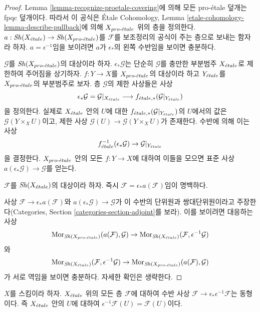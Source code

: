 \begin{proof}
Lemma \ref{lemma-recognize-proetale-covering}에 의해 모든 pro-\'etale
덮개는 fpqc 덮개이다. 따라서 이 공식은 \'Etale Cohomology, Lemma
\ref{etale-cohomology-lemma-describe-pullback}에 의해 $X_{pro\text{-}\acute{e}tale}$ 위의
층을 정의한다. $a : \mathop{\mathit{Sh}}\nolimits(X_{\acute{e}tale}) \to \mathop{\mathit{Sh}}\nolimits(X_{pro\text{-}\acute{e}tale})$를
$\mathcal{F}$를 보조정리의 공식이 주는 층으로 보내는 함자라 하자.
$a = \epsilon^{-1}$임을 보이려면 $a$가 $\epsilon_*$의 왼쪽
수반임을 보이면 충분하다.

\medskip\noindent
$\mathcal{G}$를 $\mathop{\mathit{Sh}}\nolimits(X_{pro\text{-}\acute{e}tale})$의 대상이라 하자.
$\epsilon_*\mathcal{G}$는 단순히 $\mathcal{G}$를 충만한 부분범주
$X_{\acute{e}tale}$로 제한하여 주어짐을 상기하자.
$f : Y \to X$를 $X_{pro\text{-}\acute{e}tale}$의 대상이라 하고 $Y_{\acute{e}tale}$를
$X_{pro\text{-}\acute{e}tale}$의 부분범주로 보자. 층 $\mathcal{G}$의 제한 사상들은
사상
$$
\epsilon_*\mathcal{G} = \mathcal{G}|_{X_{\acute{e}tale}}
\longrightarrow
f_{{\acute{e}tale}, *}(\mathcal{G}|_{Y_{\acute{e}tale}})
$$
을 정의한다. 실제로 $X_{\acute{e}tale}$ 안의 $U$에 대한
$f_{{\acute{e}tale}, *}(\mathcal{G}|_{Y_{\acute{e}tale}})$의 $U$에서의 값은
$\mathcal{G}(Y \times_X U)$이고, 제한 사상
$\mathcal{G}(U) \to \mathcal{G}(Y \times_X U)$가 존재한다.
수반에 의해 이는 사상
$$
f_{\acute{e}tale}^{-1}(\epsilon_*\mathcal{G}) \to \mathcal{G}|_{Y_{\acute{e}tale}}
$$
을 결정한다. $X_{pro\text{-}\acute{e}tale}$ 안의 모든 $f : Y \to X$에 대하여 이들을
모으면 표준 사상 $a(\epsilon_*\mathcal{G}) \to \mathcal{G}$를 얻는다.

\medskip\noindent
$\mathcal{F}$를 $\mathop{\mathit{Sh}}\nolimits(X_{\acute{e}tale})$의 대상이라 하자. 즉시
$\mathcal{F} = \epsilon_*a(\mathcal{F})$임이 명백하다.

\medskip\noindent
사상 $\mathcal{F} \to \epsilon_*a(\mathcal{F})$와
$a(\epsilon_*\mathcal{G}) \to \mathcal{G}$가 이 수반의 단위원과
쌍대단위원이라고 주장한다(Categories, Section
\ref{categories-section-adjoint}를 보라). 이를 보이려면 대응하는 사상
$$
\mathop{\mathrm{Mor}}\nolimits_{\mathop{\mathit{Sh}}\nolimits(X_{pro\text{-}\acute{e}tale})}(a(\mathcal{F}), \mathcal{G}) \to
\mathop{\mathrm{Mor}}\nolimits_{\mathop{\mathit{Sh}}\nolimits(X_{\acute{e}tale})}(\mathcal{F}, \epsilon^{-1}\mathcal{G})
$$
와
$$
\mathop{\mathrm{Mor}}\nolimits_{\mathop{\mathit{Sh}}\nolimits(X_{\acute{e}tale})}(\mathcal{F}, \epsilon^{-1}\mathcal{G}) \to
\mathop{\mathrm{Mor}}\nolimits_{\mathop{\mathit{Sh}}\nolimits(X_{pro\text{-}\acute{e}tale})}(a(\mathcal{F}), \mathcal{G})
$$
가 서로 역임을 보이면 충분하다. 자세한 확인은 생략한다.
\end{proof}

\begin{lemma}
\label{lemma-fully-faithful}
$X$를 스킴이라 하자. $X_{\acute{e}tale}$ 위의 모든 층 $\mathcal{F}$에 대하여
수반 사상 $\mathcal{F} \to \epsilon_*\epsilon^{-1}\mathcal{F}$는
동형이다. 즉 $X_{\acute{e}tale}$ 안의 $U$에 대하여
$\epsilon^{-1}\mathcal{F}(U) = \mathcal{F}(U)$이다.
\end{lemma}

